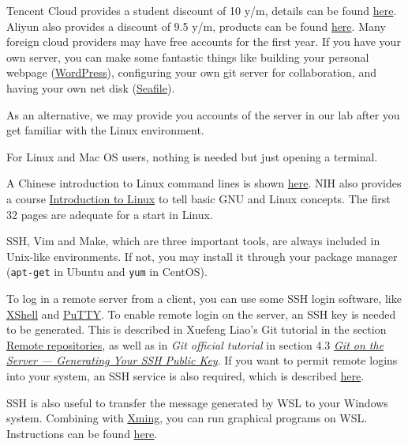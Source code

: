 \documentclass[english]{../TexTemplate/thesis}
\begin{document}
\begin{itemize}
	Tencent Cloud provides a student discount of 10 y/m, details can be found \href{https://cloud.tencent.com/act/campus?from=11419}{here}.
	Aliyun also provides a discount of 9.5 y/m, products can be found \href{https://promotion.aliyun.com/ntms/act/campus2018.html?utm_content=se_1003165671}{here}.
	Many foreign cloud providers may have free accounts for the first year.
	If you have your own server, you can make some fantastic things like building your personal webpage (\href{https://wordpress.com/}{WordPress}), configuring your own git server for collaboration, and having your own net disk (\href{https://www.seafile.com/home/}{Seafile}).

	As an alternative, we may provide you accounts of the server in our lab after you get familiar with the Linux environment.
\end{itemize}

For Linux and Mac OS users, nothing is needed but just opening a terminal.

A Chinese introduction to Linux command lines is shown \href{https://linux.cn/article-6160-1.html}{here}. NIH also provides a course \href{https://hpc.nih.gov/training/handouts/Linux_NIH_2017.pdf}{Introduction to Linux} to tell basic GNU and Linux concepts. The first 32 pages are adequate for a start in Linux.

SSH, Vim and Make, which are three important tools, are always included in Unix-like environments. If not, you may install it through your package manager (\verb'apt-get' in Ubuntu and \verb'yum' in CentOS).

To log in a remote server from a client, you can use some SSH login software, like \href{https://www.netsarang.com/en/xshell-download/}{XShell} and \href{https://www.putty.org/}{PuTTY}.
To enable remote login on the server, an SSH key is needed to be generated. This is described in Xuefeng Liao's Git tutorial in the section \href{https://www.liaoxuefeng.com/wiki/0013739516305929606dd18361248578c67b8067c8c017b000/001374385852170d9c7adf13c30429b9660d0eb689dd43a000}{Remote repositories}, as well as in \emph{Git official tutorial} in section 4.3 \href{https://git-scm.com/book/en/v2/Git-on-the-Server-Generating-Your-SSH-Public-Key}{\emph{Git on the Server --- Generating Your SSH Public Key}}. If you want to permit remote logins into your system, an SSH service is also required, which is described \href{http://www.linuxidc.com/Linux/2010-02/24349.htm}{here}.

SSH is also useful to transfer the message generated by WSL to your Windows system. Combining with \href{https://sourceforge.net/projects/xming/}{Xming}, you can run graphical programs on WSL. Instructions can be found \href{https://virtualizationreview.com/articles/2017/02/08/graphical-programs-on-windows-subsystem-on-linux.aspx}{here}.
\end{document}
